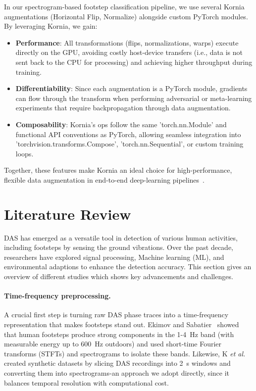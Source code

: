 In our spectrogram-based footstep classification pipeline, we use several Kornia augmentations (Horizontal Flip, Normalize) alongside custom PyTorch modules.  By leveraging Kornia, we gain:

\begin{itemize}
  \item \textbf{Performance}: All transformations (flips, normalizations, warps) execute directly on the GPU, avoiding costly host-device transfers (i.e., data is not sent back to the CPU for processing) and achieving higher throughput during training.
  \item \textbf{Differentiability}: Since each augmentation is a PyTorch module, gradients can flow through the transform when performing adversarial or meta-learning experiments that require backpropagation through data augmentation.
  \item \textbf{Composability}: Kornia's ops follow the same 'torch.nn.Module' and functional API conventions as PyTorch, allowing seamless integration into 'torchvision.transforms.Compose', 'torch.nn.Sequential', or custom training loops.
\end{itemize}

Together, these features make Kornia an ideal choice for high-performance, flexible data augmentation in end-to-end deep-learning pipelines~\cite{kornia}. 

\section{Literature Review}
DAS has emerged as a versatile tool in detection of various human activities, including footsteps by sensing the ground vibrations. Over the past decade, researchers have explored signal processing, Machine learning (ML), and environmental adaptions to enhance the detection accuracy. This section gives an overview of different studies which shows key advancements and challenges.

\paragraph{Time-frequency preprocessing.}
A crucial first step is turning raw DAS phase traces into a time-frequency representation that makes footsteps stand out. Ekimov and Sabatier~\cite{ekimov2007ultrasonic} showed that human footsteps produce strong components in the 1-4~Hz band (with measurable energy up to 600~Hz outdoors) and used short-time Fourier transforms (STFTs) and spectrograms to isolate these bands. Likewise, K \textit{et al.}~\cite{ks2021acoustic} created synthetic datasets by slicing DAS recordings into 2~s windows and converting them into spectrograms-an approach we adopt directly, since it balances temporal resolution with computational cost.

